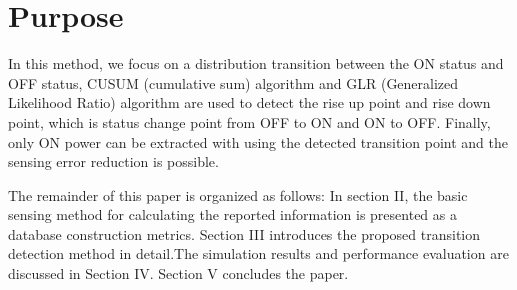 \section{Purpose}
In this method, we focus on a distribution transition between the ON status and OFF status, CUSUM (cumulative sum) algorithm \cite{ref:CUSUM} and GLR (Generalized Likelihood Ratio) algorithm \cite{ref:GLR} are used to detect the rise up point and rise down point, which is status change point from OFF to ON and ON to OFF. Finally, only ON power can be extracted with using the detected transition point and the sensing error reduction is possible. 

The remainder of this paper is organized as follows: In section II, the basic sensing method for calculating the reported information is presented as a database construction metrics. Section III introduces the proposed transition detection method in detail.The simulation results and performance evaluation are discussed in Section IV. Section V concludes the paper.


